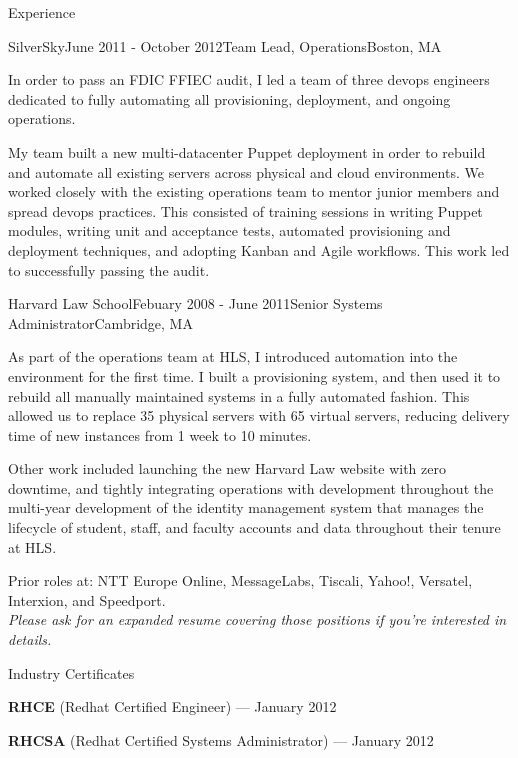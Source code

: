 \documentclass{resume} %
\begin{document}
\begin{rSection}{Experience}
\begin{rSubsection}{SilverSky}{June 2011 - October 2012}{Team Lead, Operations}{Boston, MA}
\item[] In order to pass an FDIC FFIEC audit, I led a team of three devops engineers dedicated to fully automating all provisioning, deployment, and ongoing operations.

My team built a new multi-datacenter Puppet deployment in order to rebuild and automate all existing servers across physical and cloud environments.  We worked closely with the existing operations team to mentor junior members and spread devops practices.  This consisted of training sessions in writing Puppet modules, writing unit and acceptance tests, automated provisioning and deployment techniques, and adopting Kanban and Agile workflows.  This work led to successfully passing the audit.
\end{rSubsection}

\begin{rSubsection}{Harvard Law School}{Febuary 2008 - June 2011}{Senior Systems Administrator}{Cambridge, MA}
\item[] As part of the operations team at HLS, I introduced automation into the environment for the first time.  I built a provisioning system, and then used it to rebuild all manually maintained systems in a fully automated fashion.  This allowed us to replace 35 physical servers with 65 virtual servers, reducing delivery time of new instances from 1 week to 10 minutes.

Other work included launching the new Harvard Law website with zero downtime, and tightly integrating operations with development throughout the multi-year development of the identity management system that manages the lifecycle of student, staff, and faculty accounts and data throughout their tenure at HLS.
\end{rSubsection}

\begin{center}
Prior roles at: NTT Europe Online, MessageLabs, Tiscali, Yahoo!, Versatel, Interxion, and Speedport.\\
\textit{Please ask for an expanded resume covering those positions if you're interested in details.}
\end{center}

\end{rSection}


\begin{rSection}{Industry Certificates}
\item \textbf{RHCE} (Redhat Certified Engineer) --- January 2012
\item \textbf{RHCSA} (Redhat Certified Systems Administrator) --- January 2012
\end{rSection}

\end{document}
